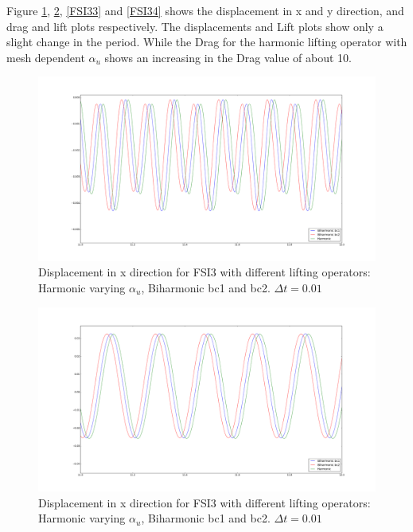 Figure \ref{FSI31}, \ref{FSI32}, \ref{FSI33} and \ref{FSI34} shows the displacement in x and y direction, and drag and lift plots respectively. The displacements and Lift plots show only a slight change in the period. While the Drag for the harmonic lifting operator with mesh dependent $\alpha_u$ shows an increasing in the Drag value of about 10.

\begin{figure}[] 
    \label{FSI31}
    \centering	
    \includegraphics[trim={3cm 3cm 3cm 3cm},clip,scale=0.20]{./Mesh_motion_results/FSI3_dt0001_dis_x.png} 
    \caption{Displacement in x direction for FSI3 with different lifting operators: Harmonic varying $\alpha_u$, Biharmonic bc1 and bc2. $\Delta t = 0.01$}
\end{figure}
\begin{figure}[]
    \label{FSI32}
    \centering
    \includegraphics[trim={3cm 3cm 3cm 3cm},scale=0.20]{./Mesh_motion_results/FSI3_dt0001_dis_y.png} 
    \caption{Displacement in x direction for FSI3 with different lifting operators: Harmonic varying $\alpha_u$, Biharmonic bc1 and bc2. $\Delta t = 0.01$}
\end{figure}
